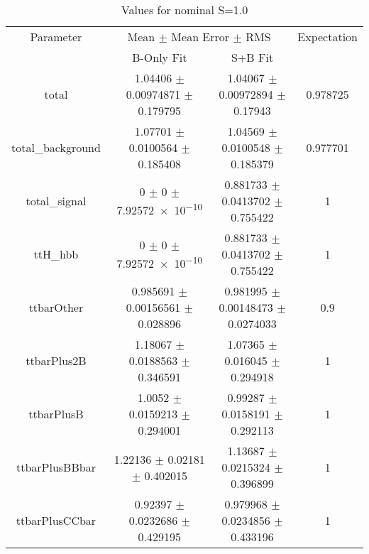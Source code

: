 \begin{table}
\centering
\caption{Values for nominal S=1.0}
\begin{tabular}{cccc}
\toprule
Parameter & \multicolumn{2}{c}{Mean $\pm$ Mean Error $\pm$ RMS} & Expectation\\
 & B-Only Fit & S+B Fit & \\
\midrule
total & \num{1.04406} $\pm$ \num{0.00974871} $\pm$ \num{0.179795} & \num{1.04067} $\pm$ \num{0.00972894} $\pm$ \num{0.17943} & \num{0.978725}\\
total\_background & \num{1.07701} $\pm$ \num{0.0100564} $\pm$ \num{0.185408} & \num{1.04569} $\pm$ \num{0.0100548} $\pm$ \num{0.185379} & \num{0.977701}\\
total\_signal & \num{0} $\pm$ \num{0} $\pm$ \num{7.92572e-10} & \num{0.881733} $\pm$ \num{0.0413702} $\pm$ \num{0.755422} & \num{1}\\
ttH\_hbb & \num{0} $\pm$ \num{0} $\pm$ \num{7.92572e-10} & \num{0.881733} $\pm$ \num{0.0413702} $\pm$ \num{0.755422} & \num{1}\\
ttbarOther & \num{0.985691} $\pm$ \num{0.00156561} $\pm$ \num{0.028896} & \num{0.981995} $\pm$ \num{0.00148473} $\pm$ \num{0.0274033} & \num{0.9}\\
ttbarPlus2B & \num{1.18067} $\pm$ \num{0.0188563} $\pm$ \num{0.346591} & \num{1.07365} $\pm$ \num{0.016045} $\pm$ \num{0.294918} & \num{1}\\
ttbarPlusB & \num{1.0052} $\pm$ \num{0.0159213} $\pm$ \num{0.294001} & \num{0.99287} $\pm$ \num{0.0158191} $\pm$ \num{0.292113} & \num{1}\\
ttbarPlusBBbar & \num{1.22136} $\pm$ \num{0.02181} $\pm$ \num{0.402015} & \num{1.13687} $\pm$ \num{0.0215324} $\pm$ \num{0.396899} & \num{1}\\
ttbarPlusCCbar & \num{0.92397} $\pm$ \num{0.0232686} $\pm$ \num{0.429195} & \num{0.979968} $\pm$ \num{0.0234856} $\pm$ \num{0.433196} & \num{1}\\
\bottomrule
\end{tabular}
\end{table}